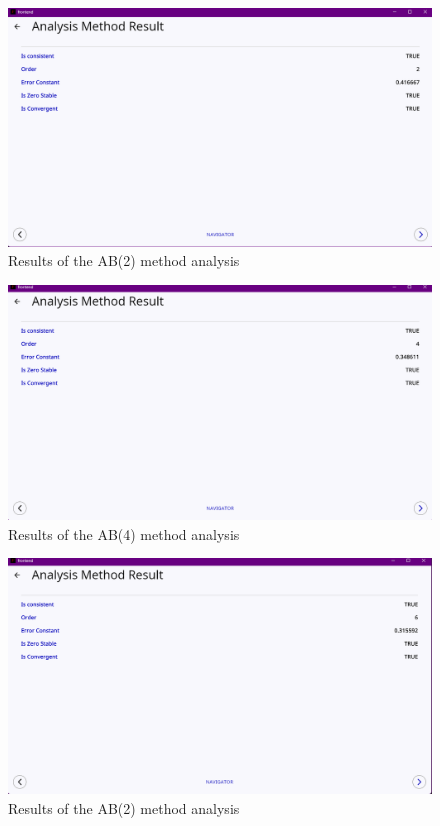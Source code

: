 \begin{figure}[htbp]
    \centering
    \includegraphics[width=1\textwidth]{chapters/4/image/ab(2)b.png}
    \caption{Results of the AB(2) method analysis}
\end{figure}

\begin{figure}[htbp]
    \centering
    \includegraphics[width=1\textwidth]{chapters/4/image/ab(4)b.png}
    \caption{Results of the AB(4) method analysis}
\end{figure}

\begin{figure}[htbp]
    \centering
    \includegraphics[width=1\textwidth]{chapters/4/image/ab(6).png}
    \caption{Results of the AB(2) method analysis}
\end{figure}


